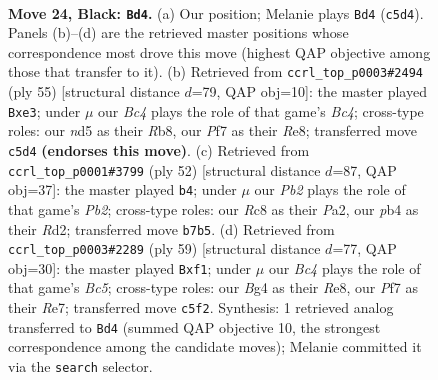\documentclass[11pt]{article}
\begin{document}
\clearpage

\begin{figure}[p]\centering
\begin{subfigure}{0.46\textwidth}\centering
\resizebox{\linewidth}{!}{%
\newchessgame
\chessboard[
  setfen={r1r5/1ppn1p1P/p5k1/P1bNP1p1/1PN1P1b1/8/8/R3KB1R b KQ - 0 24},
  showmover=false,
  pgfstyle=straightmove, color=movearrow, markmove={c5-d4}
]}
\caption{}
\end{subfigure}\hfill
\begin{subfigure}{0.46\textwidth}\centering
\resizebox{\linewidth}{!}{%
\newchessgame
\chessboard[
  setfen={1r2r1k1/p4p1p/2p3p1/P1b5/4nNP1/4P1P1/RPR4P/4BK2 b - - 6 28},
  showmover=false,
  pgfstyle=straightmove, color=movearrow, markmove={c5-e3}
]}
\caption{}
\end{subfigure}
\\[4pt]
\begin{subfigure}{0.46\textwidth}\centering
\resizebox{\linewidth}{!}{%
\newchessgame
\chessboard[
  setfen={r2br1k1/5pp1/2p4p/2p1p2P/p1Pn2P1/4BN2/PP1RPPK1/1R6 w - - 2 27},
  showmover=false,
  pgfstyle=straightmove, color=movearrow, markmove={b2-b4}
]}
\caption{}
\end{subfigure}\hfill
\begin{subfigure}{0.46\textwidth}\centering
\resizebox{\linewidth}{!}{%
\newchessgame
\chessboard[
  setfen={4r3/1p2r1k1/1np2ppp/p1N5/P1bRPPP1/7P/5K2/3R1B2 b - - 1 30},
  showmover=false,
  pgfstyle=straightmove, color=movearrow, markmove={c4-f1}
]}
\caption{}
\end{subfigure}
\caption{\textbf{Move 24, Black: \texttt{Bd4}.} (a) Our position; Melanie plays \texttt{Bd4} (\texttt{c5d4}). Panels (b)--(d) are the retrieved master positions whose correspondence most drove this move (highest QAP objective among those that transfer to it). (b) Retrieved from \texttt{ccrl\_top\_p0003\#2494} (ply 55) [structural distance $d$=79, QAP obj=10]: the master played \texttt{Bxe3}; under $\mu$ our \emph{Bc4} plays the role of that game's \emph{Bc4}; cross-type roles: our \emph{n}d5 as their \emph{R}b8, our \emph{P}f7 as their \emph{R}e8; transferred move \texttt{c5d4} \textbf{(endorses this move)}. (c) Retrieved from \texttt{ccrl\_top\_p0001\#3799} (ply 52) [structural distance $d$=87, QAP obj=37]: the master played \texttt{b4}; under $\mu$ our \emph{Pb2} plays the role of that game's \emph{Pb2}; cross-type roles: our \emph{R}c8 as their \emph{P}a2, our \emph{p}b4 as their \emph{R}d2; transferred move \texttt{b7b5}. (d) Retrieved from \texttt{ccrl\_top\_p0003\#2289} (ply 59) [structural distance $d$=77, QAP obj=30]: the master played \texttt{Bxf1}; under $\mu$ our \emph{Bc4} plays the role of that game's \emph{Bc5}; cross-type roles: our \emph{B}g4 as their \emph{R}e8, our \emph{P}f7 as their \emph{R}e7; transferred move \texttt{c5f2}. Synthesis: 1 retrieved analog transferred to \texttt{Bd4} (summed QAP objective 10, the strongest correspondence among the candidate moves); Melanie committed it via the \texttt{search} selector.}
\label{fig:thought-m47}
\end{figure}
\end{document}
